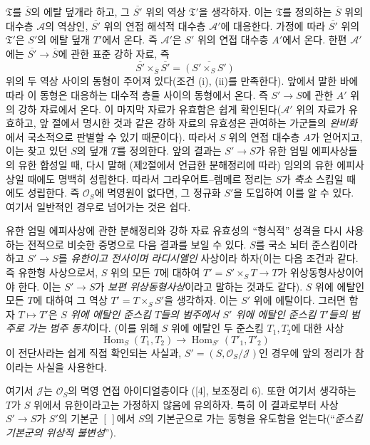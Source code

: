 \documentclass[11pt,twoside,openany]{book}
\numberwithin{equation}{section}
\newcommand{\sourceunit}{front}
\newcommand{\src}[1]{%
  \phantomsection\hypertarget{src:\sourceunit:#1}{}%
  \marginpar{\raggedleft\footnotesize\sffamily #1}%
}
\theoremstyle{plain}
\theoremstyle{definition}
\theoremstyle{remark}
\begin{document}
\src{309}
$\mathfrak T$를 $\overline S$의 에탈 덮개라 하고, 그
$\overline{S'}$ 위의 역상 $\mathfrak T'$을 생각하자. 이는
$\mathfrak T$를 정의하는 $\overline S$ 위의 대수층 $\mathcal A$의
역상인, $\overline{S'}$ 위의 연접 해석적 대수층 $\mathcal A'$에
대응한다. 가정에 따라 $\overline{S'}$ 위의 $\mathfrak T'$은 $S'$의
에탈 덮개 $T'$에서 온다. 즉 $\mathcal A'$은 $S'$ 위의 연접 대수층
$A'$에서 온다. 한편 $\mathcal A'$에는
$\overline{S'}\longrightarrow\overline S$에 관한 표준 강하 자료, 즉
\[
  \overline{S'}\times_{\overline S}\overline{S'}
  =\overline{(S'\times_SS')}
\]
위의 두 역상 사이의 동형이 주어져 있다(조건 (i), (ii)를 만족한다).
앞에서 말한 바에 따라 이 동형은 대응하는 대수적 층들 사이의 동형에서
온다. 즉 $S'\longrightarrow S$에 관한 $A'$ 위의 강하 자료에서 온다.
이 마지막 자료가 유효함은 쉽게 확인된다($\mathcal A'$ 위의 자료가
유효하고, 앞 절에서 명시한 것과 같은 강하 자료의 유효성은 관여하는
가군들의 \emph{완비화}에서 국소적으로 판별할 수 있기 때문이다). 따라서
$S$ 위의 연접 대수층 $A$가 얻어지고, 이는 찾고 있던 $S$의 덮개 $T$를
정의한다. 앞의 결과는 $S'\longrightarrow S$가 유한 엄밀 에피사상들의
유한 합성일 때, 다시 말해 (제2절에서 언급한 분해정리에 따라) 임의의
유한 에피사상일 때에도 명백히 성립한다. 따라서 그라우어트--렘메르 정리는
$S$가 \emph{축소} 스킴일 때에도 성립한다. 즉 $\mathcal O_S$에 멱영원이
없다면, 그 정규화 $S'$을 도입하여 이를 알 수 있다. 여기서 일반적인
경우로 넘어가는 것은 쉽다.

유한 엄밀 에피사상에 관한 분해정리와 강하 자료 유효성의 ``형식적'' 성격을
다시 사용하는 전적으로 비슷한 증명으로 다음 결과를 보일 수 있다.
$S$를 국소 뇌터 준스킴이라 하고 $S'\longrightarrow S$를 \emph{유한이고
전사이며 라디시엘인} 사상이라 하자(이는 다음 조건과 같다. 즉 유한형
사상으로서, $S$ 위의 모든 $T$에 대하여
$T'=S'\times_ST\longrightarrow T$가 위상동형사상이어야 한다. 이는
$S'\longrightarrow S$가 \emph{보편 위상동형사상}이라고 말하는 것과도
같다). $S$ 위에 에탈인 모든 $T$에 대하여 그 역상
$T'=T\times_SS'$을 생각하자. 이는 $S'$ 위에 에탈이다. 그러면 함자
$T\longmapsto T'$은 \emph{$S$ 위에 에탈인 준스킴 $T$들의 범주에서
$S'$ 위에 에탈인 준스킴 $T'$들의 범주로 가는 범주 동치}이다. (이를
위해 $S$ 위에 에탈인 두 준스킴 $T_1,T_2$에 대한 사상
\[
  \operatorname{Hom}_S(T_1,T_2)\longrightarrow
  \operatorname{Hom}_{S'}(T'_1,T'_2)
\]
이 전단사라는 쉽게 직접 확인되는 사실과, $S'=(S,\mathcal O_S/\mathcal J)$인
경우에 앞의 정리가 참이라는 사실을 사용한다.

\src{310}
여기서 $\mathcal J$는 $\mathcal O_S$의 멱영 연접 아이디얼층이다
([4], 보조정리 6). 또한 여기서 생각하는 $T$가 $S$ 위에서 유한이라고는
가정하지 않음에 유의하자. 특히 이 결과로부터 사상
$S'\longrightarrow S$가 $S'$의 기본군 $[\,]$에서 $S$의 기본군으로 가는
동형을 유도함을 얻는다(``\emph{준스킴 기본군의 위상적 불변성}'').
\end{document}
